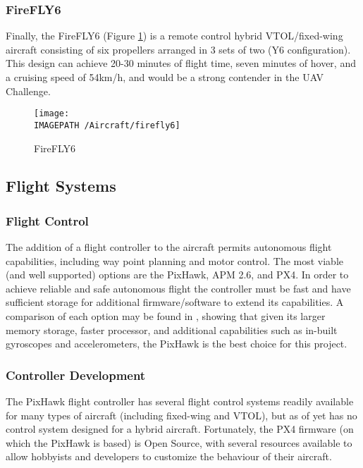 \subsubsection*{FireFLY6}
Finally, the FireFLY6\cite{ref:firefly6} (Figure \ref{fig:firefly6}) is a remote control hybrid VTOL/fixed-wing aircraft consisting of six propellers arranged in 3 sets of two (Y6 configuration). This design can achieve 20-30 minutes of flight time, seven minutes of hover, and a cruising speed of 54km/h, and would be a strong contender in the UAV Challenge.

\begin{figure}[!h]
	\centering
	\texttt{[image: \\IMAGEPATH /Aircraft/firefly6]}
	\caption{FireFLY6}
	\label{fig:firefly6}
\end{figure}

\subsection{Flight Systems}
\subsubsection*{Flight Control}
The addition of a flight controller to the aircraft permits autonomous flight capabilities, including way point planning and motor control. The most viable (and well supported) options are the PixHawk\cite{ref:pixhawk}, APM 2.6\cite{ref:ardupilot}, and PX4\cite{ref:px4}. In order to achieve reliable and safe autonomous flight the controller must be fast and have sufficient storage for additional firmware/software to extend its capabilities. A comparison of each option may be found in \cite{ref:controller_comparison}, showing that given its larger memory storage, faster processor, and additional capabilities such as in-built gyroscopes and accelerometers, the PixHawk is the best choice for this project.

\subsubsection*{Controller Development}
The PixHawk flight controller has several flight control systems readily available for many types of aircraft (including fixed-wing and VTOL), but as of yet has no control system designed for a hybrid aircraft. Fortunately, the PX4 firmware (on which the PixHawk is based) is Open Source\cite{ref:ardupilotgit}, with several resources available\cite{ref:firmware1,ref:firmware2} to allow hobbyists and developers to customize the behaviour of their aircraft.

